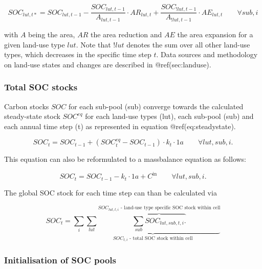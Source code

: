 \documentclass[gc, manuscript]{copernicus}
\begin{document}
\begin{equation}
SOC_{lut,t*} = SOC_{lut,t-1} - \frac{SOC_{lut,t-1}}{A_{lut,t-1}} \cdot  AR_{lut,t} + \frac{SOC_{!lut,t-1}}{A_{!lut,t-1}} \cdot  AE_{lut,t} \qquad \forall sub, i  
\label{eq:ctransfer}
\end{equation}

with \(A\) being the area, \(AR\) the area reduction and \(AE\) the area
expansion for a given land-use type \(lut\). Note that \(!lut\) denotes
the sum over all other land-use types, which decreases in the specific
time step \(t\). Data sources and methodology on land-use states and
changes are described in @ref(sec:landuse).

\subsubsection{Total SOC stocks}

Carbon stocks \(SOC\) for each sub-pool (sub) converge towards the
calculated steady-state stock \(SOC^{eq}\) for each land-use types
(lut), each sub-pool (sub) and each annual time step (t) as represented
in equation @ref(eq:steadystate).

\begin{equation}
SOC_{t} = SOC_{t-1} + (SOC^{eq}_{t} - SOC_{t-1}) \cdot k_{t} \cdot 1\unit{a} \qquad \forall lut, sub, i.
\label{eq:steadystate}
\end{equation}

This equation can also be reformulated to a massbalance equation as
follows:

\begin{equation}
SOC_{t} = SOC_{t-1} - k_{t} \cdot 1\unit{a} + C^{\textrm{in}}  \qquad \forall lut, sub, i.
\label{eq:steadystate}
\end{equation}

The global SOC stock for each time step can than be calculated via

\begin{equation}
SOC_{t} = \sum_{i} \underbrace{\sum_{lut} \overbrace{\sum_{sub} SOC_{lut, sub, t, i}.}^{\text{$SOC_{lut, t, i}$ - land-use type specific SOC stock within cell}}}_{\text{$SOC_{t, i}$ - total SOC stock within cell}}
\label{eq:totalstock}
\end{equation}

\subsubsection{Initialisation of SOC pools}
\end{document}
